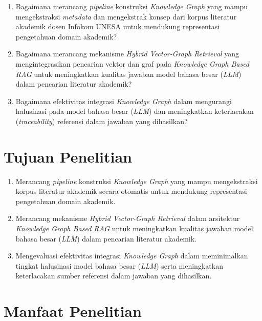 \begin{enumerate}[label=\arabic*., leftmargin=0.75cm]
    \item Bagaimana merancang \textit{pipeline} konstruksi \textit{Knowledge Graph} yang mampu mengekstraksi \textit{metadata} dan mengekstrak konsep dari korpus literatur akademik dosen Infokom UNESA untuk mendukung representasi pengetahuan domain akademik?

    \item Bagaimana merancang mekanisme \textit{Hybrid Vector-Graph Retrieval} yang mengintegrasikan pencarian vektor dan graf pada \textit{Knowledge Graph Based RAG} untuk meningkatkan kualitas jawaban model bahasa besar (\textit{LLM}) dalam pencarian literatur akademik?

    \item Bagaimana efektivitas integrasi \textit{Knowledge Graph} dalam mengurangi halusinasi pada model bahasa besar (\textit{LLM}) dan meningkatkan keterlacakan (\textit{traceability}) referensi dalam jawaban yang dihasilkan?
\end{enumerate}

\section{Tujuan Penelitian}

\begin{enumerate}[label=\arabic*., leftmargin=0.75cm]
    \item Merancang \textit{pipeline} konstruksi \textit{Knowledge Graph} yang mampu mengekstraksi korpus literatur akademik secara otomatis untuk mendukung representasi pengetahuan domain akademik.

    \item Merancang mekanisme \textit{Hybrid Vector-Graph Retrieval} dalam arsitektur \textit{Knowledge Graph Based RAG} untuk meningkatkan kualitas jawaban model bahasa besar (\textit{LLM}) dalam pencarian literatur akademik.

    \item Mengevaluasi efektivitas integrasi \textit{Knowledge Graph} dalam meminimalkan tingkat halusinasi model bahasa besar (\textit{LLM}) serta meningkatkan keterlacakan sumber referensi dalam jawaban yang dihasilkan.
\end{enumerate}

\section{Manfaat Penelitian}

